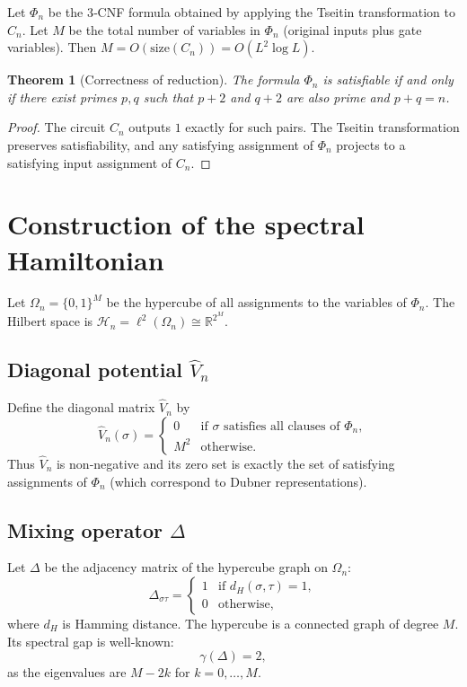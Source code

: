 \documentclass[11pt,a4paper]{article}
\newtheorem{theorem}{Theorem}[section]
\begin{document}
Let \(\Phi_n\) be the 3‑CNF formula obtained by applying the Tseitin transformation to \(C_n\). Let \(M\) be the total number of variables in \(\Phi_n\) (original inputs plus gate variables). Then \(M = O(\text{size}(C_n)) = O(L^2 \log L)\).

\begin{theorem}[Correctness of reduction]\label{thm:reduction}
The formula \(\Phi_n\) is satisfiable if and only if there exist primes \(p,q\) such that \(p+2\) and \(q+2\) are also prime and \(p+q=n\).
\end{theorem}
\begin{proof}
The circuit \(C_n\) outputs \(1\) exactly for such pairs. The Tseitin transformation preserves satisfiability, and any satisfying assignment of \(\Phi_n\) projects to a satisfying input assignment of \(C_n\).
\end{proof}

\section{Construction of the spectral Hamiltonian}

Let \(\Omega_n = \{0,1\}^M\) be the hypercube of all assignments to the variables of \(\Phi_n\). The Hilbert space is \(\mathcal{H}_n = \ell^2(\Omega_n) \cong \mathbb{R}^{2^M}\).

\subsection{Diagonal potential \(\hat{V}_n\)}
Define the diagonal matrix \(\hat{V}_n\) by
\[
\hat{V}_n(\sigma) = 
\begin{cases}
0 & \text{if }\sigma\text{ satisfies all clauses of } \Phi_n,\\
M^2 & \text{otherwise}.
\end{cases}
\]
Thus \(\hat{V}_n\) is non‑negative and its zero set is exactly the set of satisfying assignments of \(\Phi_n\) (which correspond to Dubner representations).

\subsection{Mixing operator \(\Delta\)}
Let \(\Delta\) be the adjacency matrix of the hypercube graph on \(\Omega_n\):
\[
\Delta_{\sigma\tau} = \begin{cases}
1 & \text{if } d_H(\sigma,\tau)=1,\\
0 & \text{otherwise},
\end{cases}
\]
where \(d_H\) is Hamming distance. The hypercube is a connected graph of degree \(M\). Its spectral gap is well‑known:
\[
\gamma(\Delta) = 2,
\]
as the eigenvalues are \(M - 2k\) for \(k=0,\dots,M\).
\end{document}
